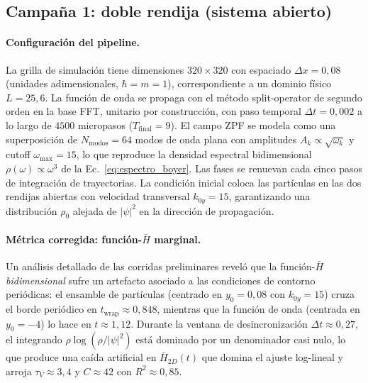 \documentclass[11pt,a4paper]{article}
\begin{document}
\subsection{Campaña 1: doble rendija (sistema abierto)}
\label{sec:doble_rendija}

\paragraph{Configuración del pipeline.}
La grilla de simulación tiene dimensiones $320\times 320$ con espaciado
$\Delta x=0{,}08$ (unidades adimensionales, $\hbar=m=1$), correspondiente
a un dominio físico $L=25{,}6$. La función de onda se propaga con el
método split-operator de segundo orden en la base FFT, unitario por
construcción, con paso temporal $\Delta t=0{,}002$ a lo largo de $4500$
micropasos ($T_\text{final}=9$). El campo ZPF se modela como una
superposición de $N_\text{modos}=64$ modos de onda plana con amplitudes
$A_k\propto\sqrt{\omega_k}$ y cutoff $\omega_\text{max}=15$, lo que
reproduce la densidad espectral bidimensional $\rho(\omega)\propto\omega^3$
de la Ec.~\eqref{eq:espectro_boyer}. Las fases se renuevan cada cinco
pasos de integración de trayectorias. La condición inicial coloca las
partículas en las dos rendijas abiertas con velocidad transversal
$k_{0y}=15$, garantizando una distribución $\rho_0$ alejada de
$|\psi|^2$ en la dirección de propagación.

\paragraph{Métrica corregida: función-$\bar{H}$ marginal.}
\label{sec:correccion_2D}
Un análisis detallado de las corridas preliminares reveló que la
función-$\bar{H}$ \emph{bidimensional} sufre un artefacto asociado a las
condiciones de contorno periódicas: el ensamble de partículas (centrado
en $y_0=0{,}08$ con $k_{0y}=15$) cruza el borde periódico en
$t_\text{wrap}\approx 0{,}848$, mientras que la función de onda
(centrada en $y_0=-4$) lo hace en $t\approx 1{,}12$. Durante la ventana
de desincronización $\Delta t\approx 0{,}27$, el integrando
$\rho\log(\rho/|\psi|^2)$ está dominado por un denominador casi nulo,
lo que produce una caída artificial en $\bar{H}_{2D}(t)$ que domina el
ajuste log-lineal y arroja $\tau_V\approx 3{,}4$ y $C\approx 42$ con
$R^2\approx 0{,}85$.
\end{document}
